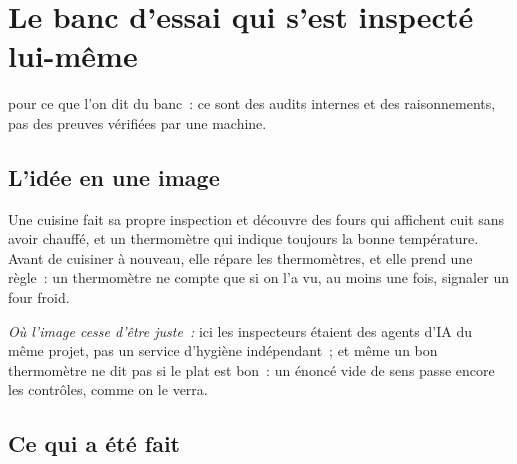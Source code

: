 \chapter[Le banc qui s'inspecte]{Le banc d'essai qui s'est inspecté lui-même}

\noindent{} pour ce que l'on dit du banc~: ce sont des audits internes et des raisonnements, pas des
preuves vérifiées par une machine.

\section*{L'idée en une image}

\begin{analogie}
Une cuisine fait sa propre inspection et découvre des fours qui affichent \og cuit\fg{} sans avoir chauffé, et un
thermomètre qui indique toujours la bonne température. Avant de cuisiner à nouveau, elle répare les thermomètres,
et elle prend une règle~: un thermomètre ne compte que si on l'a vu, au moins une fois, signaler un four froid.

\emph{Où l'image cesse d'être juste~:} ici les inspecteurs étaient des agents d'IA du même projet, pas un service
d'hygiène indépendant~; et même un bon thermomètre ne dit pas si le plat est bon~: un énoncé vide de sens passe
encore les contrôles, comme on le verra.
\end{analogie}

\section*{Ce qui a été fait}

